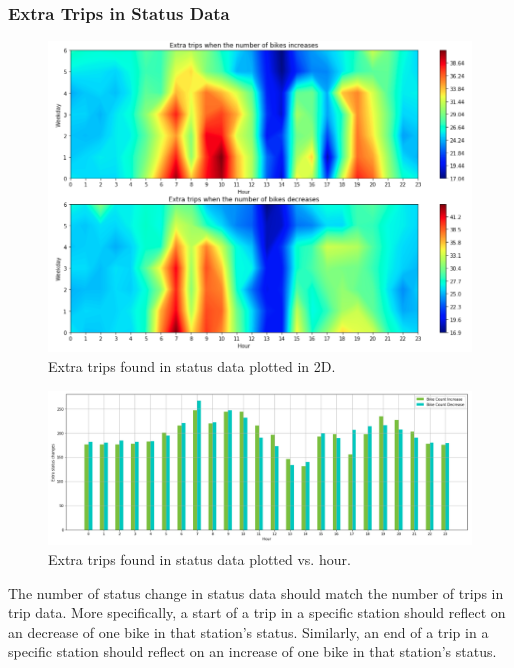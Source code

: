 \documentclass[a4paper]{article}
\begin{document}
			\subsubsection{Extra Trips in Status Data}	
			
			\begin{figure}
				\centering
				\includegraphics[width=1\textwidth]{WeekdayHour2D.png}
				\caption{\label{fig:extra_trips_2D}Extra trips found in status data plotted in 2D.}
			\end{figure}			
			
			\begin{figure}
				\centering
				\includegraphics[width=1\textwidth]{ExtraTrips.png}
				\caption{\label{fig:extra_trips_1D}Extra trips found in status data plotted vs. hour.}
			\end{figure}			
			
			The number of status change in status data should match the number of trips in trip data. More specifically, a start of a trip in a specific station should reflect on an decrease of one bike in that station's status. Similarly, an end of a trip in a specific station should reflect on an increase of one bike in that station's status. 
			
\end{document}
